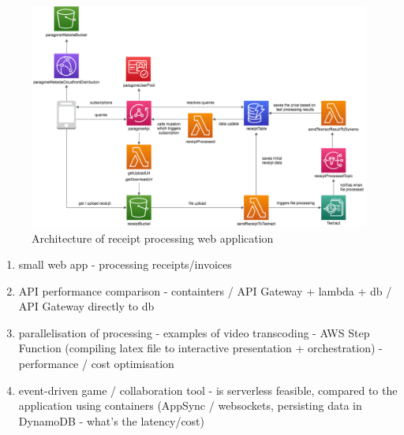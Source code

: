 \begin{figure}[h]
    \centering
    \includegraphics[width=1\textwidth]{assets/04-serverless-for-web-apps/paragoneArchitecture.png}
    \caption{Architecture of receipt processing web application}
    \label{fig:paragone-web-app}
\end{figure}

\begin{enumerate}
    \item small web app - processing receipts/invoices
    \item API performance comparison - containters / API Gateway + lambda + db / API Gateway directly to db
    \item parallelisation of processing - examples of video transcoding - AWS Step Function (compiling latex file to interactive presentation + orchestration) - performance / cost optimisation
    \item event-driven game / collaboration tool - is serverless feasible, compared to the application using containers (AppSync / websockets, persisting data in DynamoDB - what's the latency/cost)
\end{enumerate}


